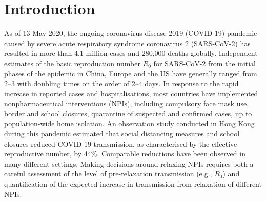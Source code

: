 \section{Introduction}
As of 13 May 2020, the ongoing coronavirus disease 2019 (COVID-19) pandemic caused by severe acute respiratory syndrome coronavirus 2 (SARS-CoV-2) has resulted in more than 4.1 million cases and 280,000 deaths globally\cite{WHO:WHOSituationReport:2020}. Independent estimates of the basic reproduction number $R_0$ for SARS-CoV-2 from the initial phases of the epidemic in China, Europe and the US have generally ranged from 2–3 with doubling times on the order of 2–4 days. In response to the rapid increase in reported cases and hospitalisations, most countries have implemented nonpharmaceutical interventions (NPIs), including compulsory face mask use, border and school closures, quarantine of suspected and confirmed cases, up to population-wide home isolation\cite{HITCOVIDTeam:HealthInterventionsTracking:2020}. An observation study conducted in Hong Kong during this pandemic estimated that social distancing measures and school closures reduced COVID-19 transmission, as characterised by the effective reproductive number, by 44\%\cite{Cowling:ImpactAssessmentNonpharmaceutical:2020}. Comparable reductions have been observed in many different settings\cite{Flaxman:Report13Estimating:2020}. Making decisions around relaxing NPIs requires both a careful assessment of the level of pre-relaxation transmission (e.g., $R_0$) and quantification of the expected increase in transmission from relaxation of different NPIs. 

